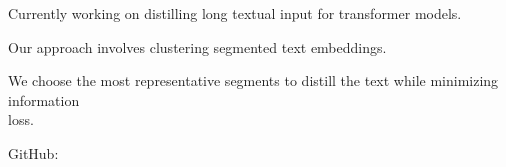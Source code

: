 \begin{resume_list}
  \item Currently working on distilling long textual input for transformer models.
  \item Our approach involves clustering segmented text embeddings.
  \item We choose the most representative segments to distill the text while minimizing information \\
  loss.
  \item GitHub: 
\end{resume_list}
